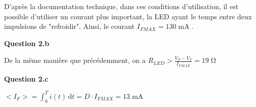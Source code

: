 \documentclass[a4paper,french]{paper}
\begin{document}
D'après la documentation technique, dans ces conditions d'utilisation, il est possible d'utiliser un courant plus important, la LED ayant le temps entre deux impulsions de "refroidir". Ainsi, le courant $I_{FMAX} = 130\operatorname{mA}$.


\textbf{Question 2.b}
	
De la même manière que précédemment, on a $R_{LED} > \frac{V_P - V_F}{I_{FMAX}} = 19\operatorname{\Omega}$

\textbf{Question 2.c}

$\displaystyle <I_F> = \int_{0}^{T} i(t) \, \mathrm{d}t = D \cdot I_{FMAX} = 13\operatorname{mA}$




\end{document}
